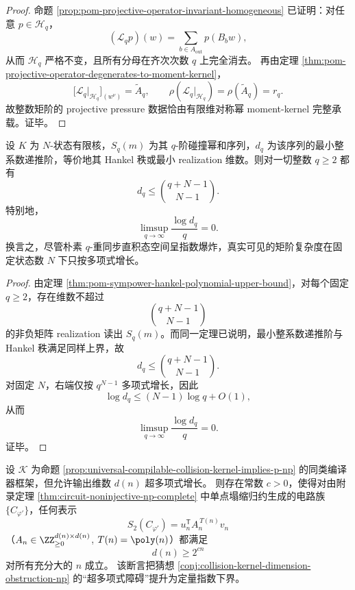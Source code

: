 \begin{proof}
命题 \ref{prop:pom-projective-operator-invariant-homogeneous} 已证明：对任意 \(p\in \mathcal H_q\)，
\[
(\mathcal L_q p)(w)=\sum_{b\in A_{\mathrm{out}}}p(B_b w),
\]
从而 \(\mathcal H_q\) 严格不变，且所有分母在齐次次数 \(q\) 上完全消去。
再由定理 \ref{thm:pom-projective-operator-degenerates-to-moment-kernel}，
\[
\bigl[\mathcal L_q\vert_{\mathcal H_q}\bigr]_{(w^\nu)}=\widetilde A_q,
\qquad
\rho(\mathcal L_q\vert_{\mathcal H_q})=\rho(\widetilde A_q)=r_q.
\]
故整数矩阶的 projective pressure 数据恰由有限维对称幂 moment-kernel 完整承载。证毕。
\end{proof}

\begin{theorem}\label{thm:conclusion-moment-hankel-rank-polynomial-taming}
设 \(K\) 为 \(N\)-状态有限核，\(S_q(m)\) 为其 \(q\)-阶碰撞幂和序列，\(d_q\) 为该序列的最小整系数递推阶，等价地其 Hankel 秩或最小 realization 维数。则对一切整数 \(q\ge 2\) 都有
\[
d_q\le \binom{q+N-1}{N-1}.
\]
特别地，
\[
\limsup_{q\to\infty}\frac{\log d_q}{q}=0.
\]
换言之，尽管朴素 \(q\)-重同步直积态空间呈指数爆炸，真实可见的矩阶复杂度在固定状态数 \(N\) 下只按多项式增长。
\end{theorem}

\begin{proof}
由定理 \ref{thm:pom-sympower-hankel-polynomial-upper-bound}，对每个固定 \(q\ge 2\)，存在维数不超过
\[
\binom{q+N-1}{N-1}
\]
的非负矩阵 realization 读出 \(S_q(m)\)。而同一定理已说明，最小整系数递推阶与 Hankel 秩满足同样上界，故
\[
d_q\le \binom{q+N-1}{N-1}.
\]
对固定 \(N\)，右端仅按 \(q^{N-1}\) 多项式增长，因此
\[
\log d_q\le (N-1)\log q+O(1),
\]
从而
\[
\limsup_{q\to\infty}\frac{\log d_q}{q}=0.
\]
证毕。
\end{proof}

\begin{conjecture}[碰撞核维度的指数级刚性]\label{conj:conclusion-collision-kernel-exponential-rigidity}
设 \(\mathcal K\) 为命题 \ref{prop:universal-compilable-collision-kernel-implies-p-np} 的同类编译器框架，但允许输出维数 \(d(n)\) 超多项式增长。
则存在常数 \(c>0\)，使得对由附录定理 \ref{thm:circuit-noninjective-np-complete} 中单点塌缩归约生成的电路族 \(\{C_{\varphi'}\}\)，任何表示
\[
S_2(C_{\varphi'})=u_n^{\mathsf T}A_n^{\,T(n)}v_n
\]
（\(A_n\in\ZZ_{\ge 0}^{d(n)\times d(n)}\), \(T(n)=\poly(n)\)）都满足
\[
d(n)\ge 2^{cn}
\]
对所有充分大的 \(n\) 成立。
该断言把猜想 \ref{conj:collision-kernel-dimension-obstruction-np} 的“超多项式障碍”提升为定量指数下界。
\end{conjecture}






